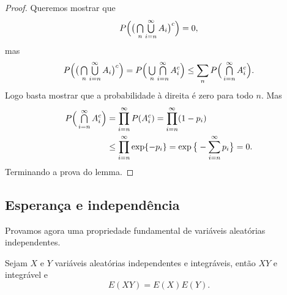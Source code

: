 \begin{proof}
  Queremos mostrar que
  \begin{equation}
    P \Big( \big(\operatorname*{{\textstyle \bigcap}}_n \operatorname*{{\textstyle \bigcup}}_{i=n}^\infty A_i\big)^c \Big) = 0,
  \end{equation}
  mas
  \begin{equation}
    P \Big( \big(\operatorname*{{\textstyle \bigcap}}_n \operatorname*{{\textstyle \bigcup}}_{i=n}^\infty A_i\big)^c \Big) = P \Big(\operatorname*{{\textstyle \bigcup}}_n \operatorname*{{\textstyle \bigcap}}_{i=n}^\infty A_i^c \Big) \leq \sum\limits_n P \Big(\operatorname*{{\textstyle \bigcap}}_{i=n}^\infty A_i^c \Big).
  \end{equation}
  Logo basta mostrar que a probabilidade à direita é zero para todo $n$.
  Mas
  \begin{equation}
    \begin{split}
      P \Big(\operatorname*{{\textstyle \bigcap}}_{i=n}^\infty A_i^c \Big) & = \prod\limits_{i=n}^\infty P(A_i^c) = \prod\limits_{i=n}^\infty (1 - p_i)\\
      & \leq \prod\limits_{i=n}^\infty \exp\{-p_i\} = \exp\big\{- \sum_{i=n}^\infty p_i\big\} = 0.
    \end{split}
  \end{equation}
  Terminando a prova do lemma.
\end{proof}

\subsection{Esperança e independência}

Provamos agora uma propriedade fundamental de variáveis aleatórias independentes.

\begin{proposition}\label{prop:indep}
  Sejam $X$ e $Y$ variáveis aleatórias independentes e integráveis, então $XY$ e integrável e
  \begin{equation}
    E(XY) = E(X) E(Y).
  \end{equation}
\end{proposition}

